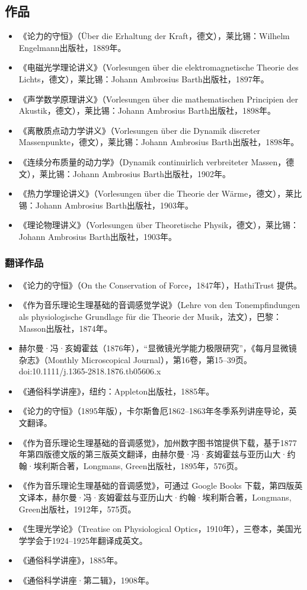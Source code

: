 \subsection{作品}
\begin{itemize}
\item 《论力的守恒》（Über die Erhaltung der Kraft，德文），莱比锡：Wilhelm Engelmann出版社，1889年。
\item 《电磁光学理论讲义》（Vorlesungen über die elektromagnetische Theorie des Lichts，德文），莱比锡：Johann Ambrosius Barth出版社，1897年。
\item 《声学数学原理讲义》（Vorlesungen über die mathematischen Principien der Akustik，德文），莱比锡：Johann Ambrosius Barth出版社，1898年。
\item 《离散质点动力学讲义》（Vorlesungen über die Dynamik discreter Massenpunkte，德文），莱比锡：Johann Ambrosius Barth出版社，1898年。
\item 《连续分布质量的动力学》（Dynamik continuirlich verbreiteter Massen，德文），莱比锡：Johann Ambrosius Barth出版社，1902年。
\item 《热力学理论讲义》（Vorlesungen über die Theorie der Wärme，德文），莱比锡：Johann Ambrosius Barth出版社，1903年。
\item 《理论物理讲义》（Vorlesungen über Theoretische Physik，德文），莱比锡：Johann Ambrosius Barth出版社，1903年。
\end{itemize}
\subsubsection{翻译作品}
\begin{itemize}
\item 《论力的守恒》（On the Conservation of Force，1847年），HathiTrust 提供。
\item 《作为音乐理论生理基础的音调感觉学说》（Lehre von den Tonempfindungen als physiologische Grundlage für die Theorie der Musik，法文），巴黎：Masson出版社，1874年。
\item 赫尔曼·冯·亥姆霍兹（1876年），“显微镜光学能力极限研究”，《每月显微镜杂志》（Monthly Microscopical Journal），第16卷，第15–39页。doi:10.1111/j.1365-2818.1876.tb05606.x
\item 《通俗科学讲座》，纽约：Appleton出版社，1885年。
\item 《论力的守恒》（1895年版），卡尔斯鲁厄1862–1863年冬季系列讲座导论，英文翻译。
\item 《作为音乐理论生理基础的音调感觉》，加州数字图书馆提供下载，基于1877年第四版德文版的第三版英文翻译，由赫尔曼·冯·亥姆霍兹与亚历山大·约翰·埃利斯合著，Longmans, Green出版社，1895年，576页。
\item 《作为音乐理论生理基础的音调感觉》，可通过 Google Books 下载，第四版英文译本，赫尔曼·冯·亥姆霍兹与亚历山大·约翰·埃利斯合著，Longmans, Green出版社，1912年，575页。
\item 《生理光学论》（Treatise on Physiological Optics，1910年），三卷本，美国光学学会于1924–1925年翻译成英文。
\item 《通俗科学讲座》，1885年。
\item 《通俗科学讲座·第二辑》，1908年。
\end{itemize}
